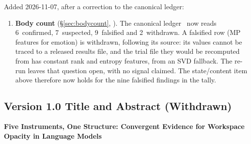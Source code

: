 \documentclass[11pt,a4paper]{article}
\begin{document}
\noindent Added 2026-11-07, after a correction to the canonical ledger:

\begin{enumerate}[nosep,leftmargin=*,resume]
\item \textbf{Body count} (\S\ref{sec:bodycount}, ).
  The canonical ledger~\citep{lyra2026metapattern} now reads 6~confirmed,
  7~suspected, 9~falsified and 2~withdrawn. A falsified row (MP features
  for emotion) is withdrawn, following its source: its values cannot be
  traced to a released results file, and the trial file they would be
  recomputed from has constant rank and entropy features, from an SVD
  fallback. The re-run leaves that question open, with no signal claimed.
  The state/content item above therefore now holds for the nine falsified
  findings in the tally.
\end{enumerate}

\subsection*{Version 1.0 Title and Abstract (Withdrawn)}

\noindent\textbf{Five Instruments, One Structure: Convergent Evidence for
Workspace Opacity in Language Models}
\end{document}
